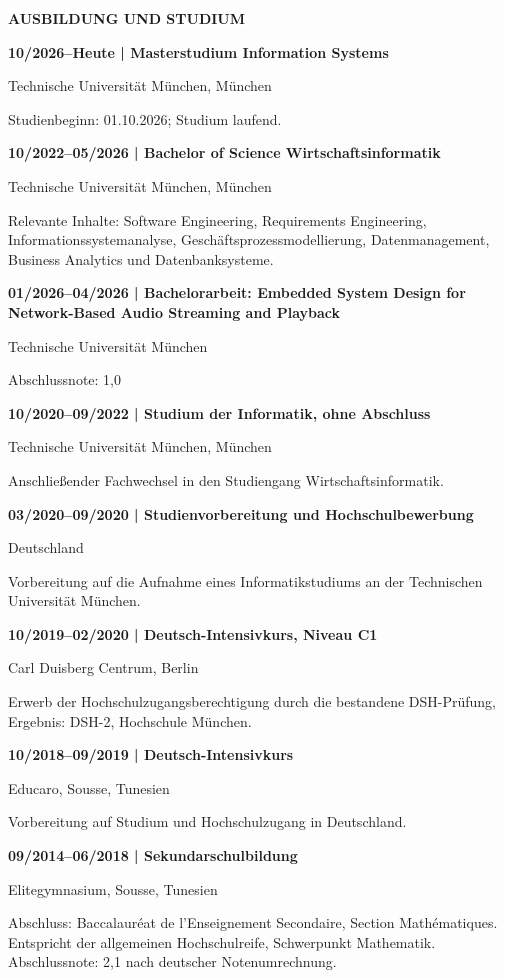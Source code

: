 \documentclass[10pt,a4paper]{article}
\newcommand{\sectiontitle}[1]{%
  \vspace{6pt}%
  \noindent\hspace{1.1em}\colorbox{white}{\bfseries\MakeUppercase{#1}}\par
  \vspace{1pt}%
}
\newenvironment{cvsection}[1]{%
  \Needspace{5\baselineskip}%
  \sectiontitle{#1}%
  \begin{lrbox}{\cvsectionbox}%
    \begin{minipage}{\dimexpr\textwidth-2\fboxsep-2\fboxrule-4pt\relax}%
    \vspace{2pt}
}{%
    \vspace{2pt}
    \end{minipage}%
  \end{lrbox}%
  \noindent\fbox{\usebox{\cvsectionbox}}%
  \par
}
\newcommand{\educationitem}[3]{%
  \textbf{#1 | #2}\par
  #3\par
}
\begin{document}
\begin{cvsection}{Ausbildung und Studium}
\educationitem{10/2026--Heute}{Masterstudium Information Systems}{Technische Universität München, München}
Studienbeginn: 01.10.2026; Studium laufend.

\vspace{2pt}
\educationitem{10/2022--05/2026}{Bachelor of Science Wirtschaftsinformatik}{Technische Universität München, München}
Relevante Inhalte: Software Engineering, Requirements Engineering, Informationssystemanalyse, Geschäftsprozessmodellierung, Datenmanagement, Business Analytics und Datenbanksysteme.

\vspace{2pt}
\educationitem{01/2026--04/2026}{Bachelorarbeit: Embedded System Design for Network-Based Audio Streaming and Playback}{Technische Universität München}
Abschlussnote: 1,0

\vspace{2pt}
\educationitem{10/2020--09/2022}{Studium der Informatik, ohne Abschluss}{Technische Universität München, München}
Anschließender Fachwechsel in den Studiengang Wirtschaftsinformatik.

\vspace{2pt}
\educationitem{03/2020--09/2020}{Studienvorbereitung und Hochschulbewerbung}{Deutschland}
Vorbereitung auf die Aufnahme eines Informatikstudiums an der Technischen Universität München.

\vspace{2pt}
\educationitem{10/2019--02/2020}{Deutsch-Intensivkurs, Niveau C1}{Carl Duisberg Centrum, Berlin}
Erwerb der Hochschulzugangsberechtigung durch die bestandene DSH-Prüfung, Ergebnis: DSH-2, Hochschule München.

\vspace{2pt}
\educationitem{10/2018--09/2019}{Deutsch-Intensivkurs}{Educaro, Sousse, Tunesien}
Vorbereitung auf Studium und Hochschulzugang in Deutschland.

\vspace{2pt}
\educationitem{09/2014--06/2018}{Sekundarschulbildung}{Elitegymnasium, Sousse, Tunesien}
Abschluss: Baccalauréat de l'Enseignement Secondaire, Section Mathématiques. Entspricht der allgemeinen Hochschulreife, Schwerpunkt Mathematik. Abschlussnote: 2,1 nach deutscher Notenumrechnung.
\end{cvsection}
\end{document}
